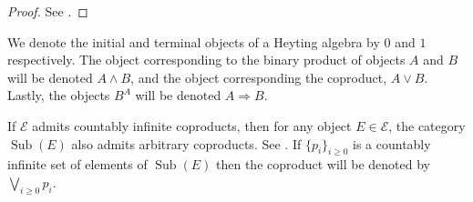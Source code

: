 \documentclass{tac}
\newcommand{\call}[1]{\mathcal{#1}}
\begin{document}
	\begin{proof}
		See \cite[\S A1.4]{Johnstone}.
	\end{proof}
	\begin{definition}
		\label{heytingnotation}
		We denote the initial and terminal objects of a Heyting algebra by $0$ and $1$ respectively. The object corresponding to the binary product of objects $A$ and $B$ will be denoted $A \wedge B$, and the object corresponding the coproduct, $A \vee B$. Lastly, the objects $B^A$ will be denoted $A \Rightarrow B$.
	\end{definition}
	\begin{remark}
		\label{rmk:countable_colimits}
		If $\call{E}$ admits countably infinite coproducts, then for any object $E \in \call{E}$, the category $\operatorname{Sub}(E)$ also admits arbitrary coproducts. See \cite[\S A1.4]{Johnstone}. If $\lbrace p_i \rbrace_{i \geq 0}$ is a countably infinite set of elements of $\operatorname{Sub}(E)$ then the coproduct will be denoted by $\bigvee_{i\geq 0}p_i$.
	\end{remark}
	
\end{document}
